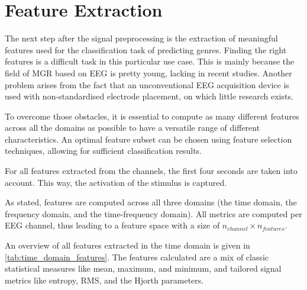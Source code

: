   \section{Feature Extraction} \label{sec:feature_extract_method}
    The next step after the signal preprocessing is the extraction of meaningful features used for the classification task of predicting genres. Finding the right features is a difficult task in this particular use case. This is mainly because the field of \ac{MGR} based on \ac{EEG} is pretty young, lacking in recent studies. Another problem arises from the fact that an unconventional \ac{EEG} acquisition device is used with non-standardised electrode placement, on which little research exists. \par
    To overcome those obstacles, it is essential to compute as many different features across all the domains as possible to have a versatile range of different characteristics. An optimal feature subset can be chosen using feature selection techniques, allowing for sufficient classification results. \par
    For all features extracted from the channels, the first four seconds are taken into account. This way, the activation of the stimulus is captured. \par
    As stated, features are computed across all three domains (the time domain, the frequency domain, and the time-frequency domain). All metrics are computed per \ac{EEG} channel, thus leading to a feature space with a size of $n_{channel} \times n_{features}$. \par
    An overview of all features extracted in the time domain is given in \autoref{tab:time_domain_features}. The features calculated are a mix of classic statistical measures like mean, maximum, and minimum, and tailored signal metrics like entropy, \ac{RMS}, and the Hjorth parameters. \par 
